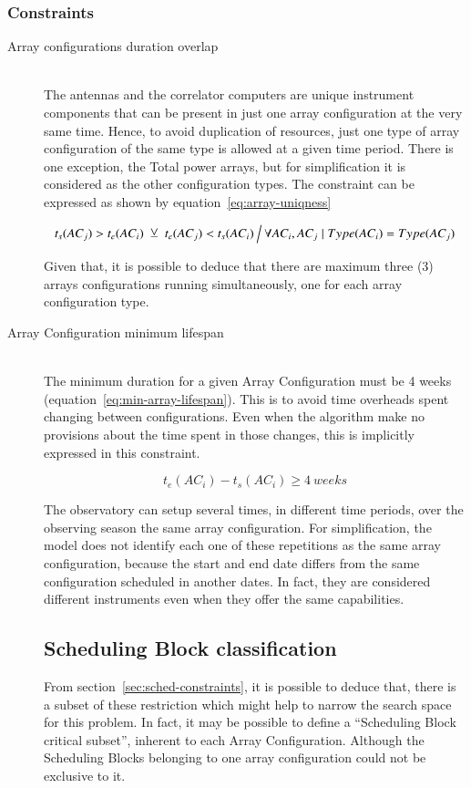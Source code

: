 \subsubsection{Constraints}
\begin{description}
\item[Array configurations duration overlap] \hfill \\
The antennas and the correlator computers are unique instrument components that can be present in just one array configuration at the very same time. Hence, to avoid duplication of resources, just one type of array configuration of the same type is allowed at a given time period. There is one exception, the Total power arrays, but for simplification it is considered as the other configuration types. The constraint can be expressed as shown by equation~\ref{eq:array-uniqness}

\begin{equation}
\label{eq:array-uniqness}
t_s(AC_j) > t_e(AC_i)\; \veebar \; t_e(AC_j) < t_s(AC_i) \:
\Big\slash \: \forall AC_i, AC_j \mid Type(AC_i) = Type(AC_j)
\end{equation}

Given that, it is possible to deduce that there are maximum three (3) arrays configurations running simultaneously, one for each array configuration type.

\item[Array Configuration minimum lifespan] \hfill \\
The minimum duration for a given Array Configuration must be 4 weeks (equation~\ref{eq:min-array-lifespan}). This is to avoid time overheads spent changing between configurations. Even when the algorithm make no provisions about the time spent in those changes, this is implicitly expressed in this constraint.

\begin{equation}
\label{eq:min-array-lifespan}
t_e(AC_i) - t_s(AC_i) \geq 4\:weeks
\end{equation}

The observatory can setup several times, in different time periods, over the observing season the same array configuration. For simplification, the model does not identify each one of these repetitions as the same array configuration, because the start and end date differs from the same configuration scheduled in another dates. In fact, they are considered different instruments even when they offer the same capabilities.

\subsection{Scheduling Block classification}
From section~\ref{sec:sched-constraints}, it is possible to deduce that, there is a subset of these restriction which might help to narrow the search space for this problem. In fact, it may be possible to define a ``Scheduling Block critical subset'', inherent to each Array Configuration. Although the Scheduling Blocks belonging to one array configuration could not be exclusive to it.


\end{description}
